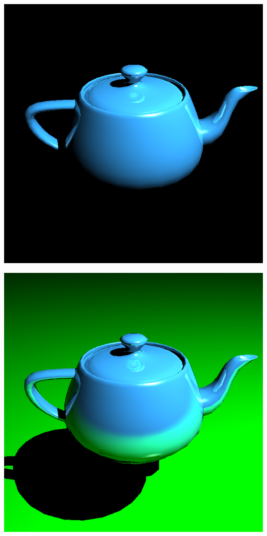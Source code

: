 \begin{center}
\begin{minipage}{0.48\linewidth}
\includegraphics[width=\linewidth]{img/teapot.png}
\end{minipage}
\begin{minipage}{0.48\linewidth}
\includegraphics[width=\linewidth]{img/teapot-plane.png}
\end{minipage}
\end{center}
